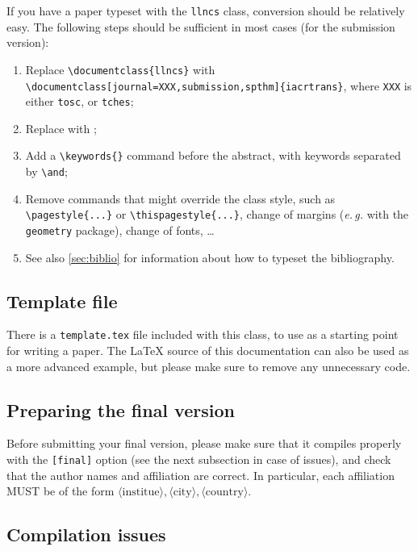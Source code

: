 \documentclass{iacrtrans}
\begin{document}
If you have a paper typeset with the \texttt{llncs} class, conversion
should be relatively easy.  The following steps should be sufficient
in most cases (for the submission version):
\begin{enumerate}
\item Replace \verb+\documentclass{llncs}+ with\\
    \verb+\documentclass[journal=XXX,submission,spthm]{iacrtrans}+,
    where \verb+XXX+ is either \verb+tosc+, or \verb+tches+;
\item Replace \verb++ with
  \verb++;
\item Add a \verb+\keywords{}+ command before the abstract, with
  keywords separated by \verb+\and+;
\item Remove commands that might override the class style, such as
  \verb+\pagestyle{...}+ or \verb+\thispagestyle{...}+,
  change of margins (\emph{e.\,g.}  with the \texttt{geometry} package),
  change of fonts, \ldots
\item See also \autoref{sec:biblio} for information about how to
  typeset the bibliography.
\end{enumerate}

\subsection{Template file}

There is a \texttt{template.tex} file included with this class, to use
as a starting point for writing a paper.  The \LaTeX{} source of this
documentation can also be used as a more advanced example, but please
make sure to remove any unnecessary code.

\subsection{Preparing the final version}

Before submitting your final version, please make sure that it compiles
properly with the \texttt{[final]} option (see the next subsection in
case of issues), and check that the author names and affiliation are
correct.  In particular, each affiliation MUST be of the form
$\langle\text{institue}\rangle, \langle\text{city}\rangle,
\langle\text{country}\rangle$.

\subsection{Compilation issues}
\end{document}
